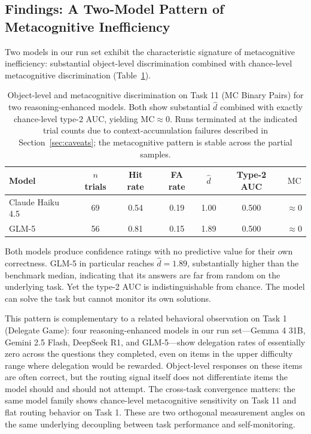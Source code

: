 \subsection{Findings: A Two-Model Pattern of Metacognitive Inefficiency}
\label{sec:findings-mc-inefficiency}

Two models in our run set exhibit the characteristic signature of metacognitive inefficiency: substantial object-level discrimination combined with chance-level metacognitive discrimination (Table~\ref{tab:mc-inefficiency}).

\begin{table}[h]
\centering
\small
\begin{tabular}{lcccccc}
\toprule
Model & $n$ trials & Hit rate & FA rate & $\hat{d}$ & Type-2 AUC & $\mathrm{MC}$ \\
\midrule
Claude Haiku 4.5 & 69 & 0.54 & 0.19 & 1.00 & 0.500 & $\approx 0$ \\
GLM-5 & 56 & 0.81 & 0.15 & 1.89 & 0.500 & $\approx 0$ \\
\bottomrule
\end{tabular}
\caption{Object-level and metacognitive discrimination on Task 11 (MC Binary Pairs) for two reasoning-enhanced models. Both show substantial $\hat{d}$ combined with exactly chance-level type-2 AUC, yielding $\mathrm{MC} \approx 0$. Runs terminated at the indicated trial counts due to context-accumulation failures described in Section~\ref{sec:caveats}; the metacognitive pattern is stable across the partial samples.}
\label{tab:mc-inefficiency}
\end{table}

Both models produce confidence ratings with no predictive value for their own correctness. GLM-5 in particular reaches $\hat{d} = 1.89$, substantially higher than the benchmark median, indicating that its answers are far from random on the underlying task. Yet the type-2 AUC is indistinguishable from chance. The model can solve the task but cannot monitor its own solutions.

This pattern is complementary to a related behavioral observation on Task 1 (Delegate Game): four reasoning-enhanced models in our run set---Gemma 4 31B, Gemini 2.5 Flash, DeepSeek R1, and GLM-5---show delegation rates of essentially zero across the questions they completed, even on items in the upper difficulty range where delegation would be rewarded. Object-level responses on these items are often correct, but the routing signal itself does not differentiate items the model should and should not attempt. The cross-task convergence matters: the same model family shows chance-level metacognitive sensitivity on Task 11 and flat routing behavior on Task 1. These are two orthogonal measurement angles on the same underlying decoupling between task performance and self-monitoring.

